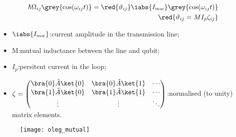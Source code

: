 \begin{minipage}[r]{0.5\textwidth}
  \begin{framed}\noindent

    \begin{equation}\label{eq:couple7}
      \begin{aligned}
        \hbar\Omega_{ij}\grey{\cos(\omega_{ij} t)} = \red{\vartheta_{ij}}\iabs{I_{mw}}\grey{\cos(\omega_{ij} t)}&  \\
        \red{\vartheta_{ij} = MI_p\zeta_{ij}} &
      \end{aligned}
    \end{equation}

    \begin{itemize}
    \item $ \iabs{I_{mw}} $:\hfill current amplitude in the transmission
      line;
    \item M:\hfill mutual inductance between the line and qubit;
    \item $ I_p $:\hfill persitent current in the loop;
    \item $ \zeta = \begin{pmatrix}
        \bra{0}\hat{A}\ket{0} & \bra{0}\hat{A}\ket{1} & \cdots\\
        \bra{1}\hat{A}\ket{0} & \bra{1}\hat{A}\ket{1} & \cdots\\
        \vdots & \vdots & \ddots
      \end{pmatrix} $:\hfill normalised (to unity) matrix elements.
    \end{itemize}

  \end{framed}
\end{minipage}
\begin{figure}[h]
  \centering \texttt{[image: oleg\_mutual]}
\end{figure}

\noindent

\newpage

